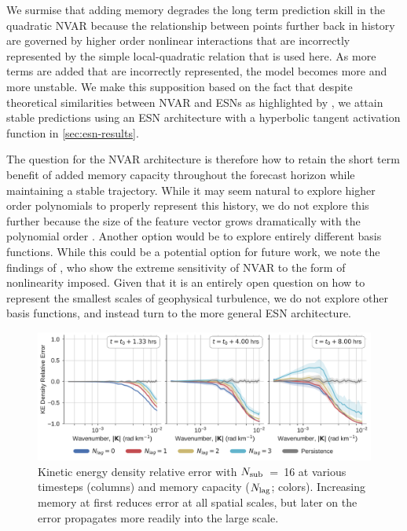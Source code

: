 \documentclass[draft]{agujournal2019}
\newcommand{\citep}{\cite}
\newcommand{\citet}{\citeA}
\begin{document}
We surmise that adding memory degrades the long term prediction skill in the
quadratic NVAR because
the relationship between points further back in history are governed by higher
order nonlinear interactions that are incorrectly represented by
the simple local-quadratic relation that is used here.
As more terms are added that are incorrectly represented, the model becomes
more and more unstable.
We make this supposition based on the fact that despite
theoretical similarities between NVAR and
ESNs as highlighted by \citet{bollt_explaining_2021}, we attain stable
predictions using an ESN architecture with a hyperbolic tangent activation
function in \cref{sec:esn-results}.

The question for the NVAR architecture
is therefore how to retain the short term benefit of added memory
capacity throughout the forecast horizon while maintaining a stable trajectory.
While it may seem natural to explore higher order polynomials to
properly represent this history, we do not explore this further because the size
of the feature vector grows dramatically with the polynomial order
\citep{chen_next_2022}.
Another option would be to explore entirely different basis functions.
While this could be a potential option for future work, we note the findings of
\citet{zhang_catch-22_2022}, who show the extreme sensitivity of NVAR to the
form of nonlinearity imposed.
Given that it is an entirely open question on how to represent the smallest
scales of geophysical turbulence, we do not explore other basis functions, and
instead turn to the more general ESN architecture.

\begin{figure}
    \centering
    \includegraphics[width=\textwidth]{figures/nvar_ke_relerr_vs_lag.pdf}
    \caption{Kinetic energy density relative error with $N_\text{sub}$~=~16 at various
        timesteps (columns) and memory capacity ($N_\text{lag}$; colors).
        Increasing memory at first reduces error at all spatial scales, but
        later on the error propagates more readily into the large scale.
    }
    \label{fig:nvar_ke_vs_lag}
\end{figure}
\end{document}
